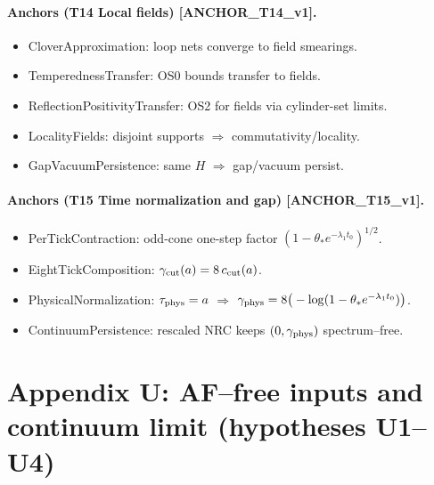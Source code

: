 \documentclass[11pt]{amsart}
\theoremstyle{plain}
\theoremstyle{definition}
\theoremstyle{remark}
\begin{document}
\paragraph{Anchors (T14 Local fields) [ANCHOR\_T14\_v1].}
\begin{itemize}
  \item CloverApproximation: loop nets converge to field smearings.
  \item TemperednessTransfer: OS0 bounds transfer to fields.
  \item ReflectionPositivityTransfer: OS2 for fields via cylinder-set limits.
  \item LocalityFields: disjoint supports $\Rightarrow$ commutativity/locality.
  \item GapVacuumPersistence: same $H$ $\Rightarrow$ gap/vacuum persist.
\end{itemize}

\paragraph{Anchors (T15 Time normalization and gap) [ANCHOR\_T15\_v1].}
\begin{itemize}
  \item PerTickContraction: odd-cone one-step factor $(1-\theta_* e^{-\lambda_1 t_0})^{1/2}$.
  \item EightTickComposition: $\gamma_{\rm cut}(a)=8\,c_{\rm cut}(a)$.
  \item PhysicalNormalization: $\tau_{\rm phys}=a$ $\Rightarrow$ $\gamma_{\rm phys}=8\big(-\log(1-\theta_* e^{-\lambda_1 t_0})\big)$.
  \item ContinuumPersistence: rescaled NRC keeps $(0,\gamma_{\rm phys})$ spectrum–free.
\end{itemize}

\medskip

\section{Appendix U: AF--free inputs and continuum limit (hypotheses U1--U4)}
\end{document}
